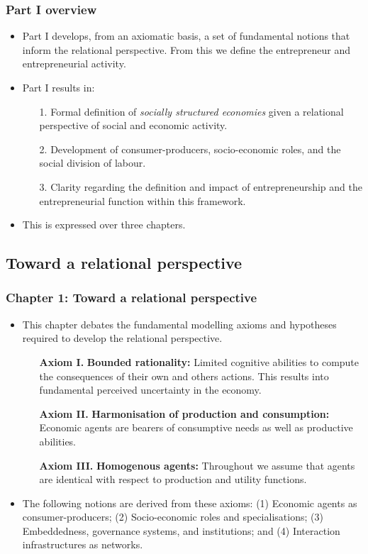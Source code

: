 \documentclass[10pt]{beamer}
\begin{document}
\begin{frame} \frametitle{Part I overview}
\begin{itemize}
\item Part I develops, from an axiomatic basis, a set of fundamental notions that inform the relational perspective. From this we define the entrepreneur and entrepreneurial activity.
\medskip
\item Part I results in:
\begin{itemize}
\medskip
\item[1.] Formal definition of \emph{socially structured economies} given a relational perspective of social and economic activity.
\medskip
\item[2.] Development of consumer-producers, socio-economic roles, and the social division of labour.
\medskip
\item[3.] Clarity regarding the definition and impact of entrepreneurship and the entrepreneurial function within this framework.
\end{itemize}
\medskip
\item This is expressed over three chapters.
\end{itemize}
\end{frame}

\subsection{Toward a relational perspective}

\begin{frame} \frametitle{Chapter 1: Toward a relational perspective}
\begin{itemize}
\item This chapter debates the fundamental modelling axioms and hypotheses required to develop the relational perspective.
\begin{itemize}
\medskip
\item[\textbf{Axiom I.}] \textbf{Bounded rationality:} Limited cognitive abilities to compute the consequences of their own and others actions. This results into fundamental perceived uncertainty in the economy.
\medskip
\item[\textbf{Axiom II.}] \textbf{Harmonisation of production and consumption:} Economic agents are bearers of consumptive needs as well as productive abilities.
\medskip
\item[\textbf{Axiom III.}] \textbf{Homogenous agents:} Throughout we assume that agents are identical with respect to production and utility functions.
\end{itemize}
\medskip
\item The following notions are derived from these axioms: (1) Economic agents as consumer-producers; (2) Socio-economic roles and specialisations; (3) Embeddedness, governance systems, and institutions; and (4) Interaction infrastructures as networks.
\end{itemize}
\end{frame}
\end{document}
